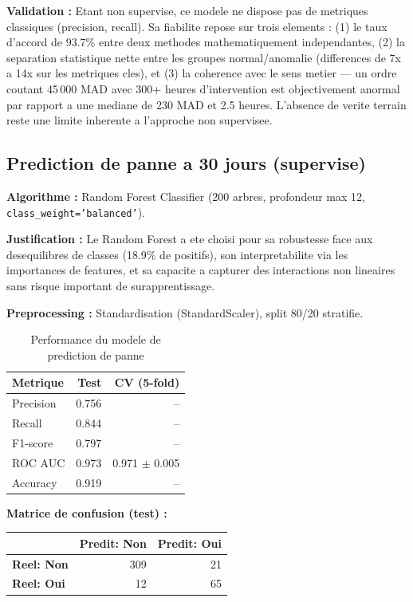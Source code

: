 \documentclass[12pt,a4paper]{article}
\begin{document}
\textbf{Validation :} Etant non supervise, ce modele ne dispose pas de metriques classiques (precision, recall). Sa fiabilite repose sur trois elements : (1) le taux d'accord de 93.7\% entre deux methodes mathematiquement independantes, (2) la separation statistique nette entre les groupes normal/anomalie (differences de 7x a 14x sur les metriques cles), et (3) la coherence avec le sens metier --- un ordre coutant 45\,000 MAD avec 300+ heures d'intervention est objectivement anormal par rapport a une mediane de 230 MAD et 2.5 heures. L'absence de verite terrain reste une limite inherente a l'approche non supervisee.

\subsection{Prediction de panne a 30 jours (supervise)}

\textbf{Algorithme :} Random Forest Classifier (200 arbres, profondeur max 12, \texttt{class\_weight='balanced'}).

\textbf{Justification :} Le Random Forest a ete choisi pour sa robustesse face aux desequilibres de classes (18.9\% de positifs), son interpretabilite via les importances de features, et sa capacite a capturer des interactions non lineaires sans risque important de surapprentissage.

\textbf{Preprocessing :} Standardisation (StandardScaler), split 80/20 stratifie.

\begin{table}[H]
\centering
\begin{tabular}{lrr}
\toprule
\textbf{Metrique} & \textbf{Test} & \textbf{CV (5-fold)} \\
\midrule
Precision & 0.756 & -- \\
Recall & 0.844 & -- \\
F1-score & 0.797 & -- \\
ROC AUC & 0.973 & 0.971 $\pm$ 0.005 \\
Accuracy & 0.919 & -- \\
\bottomrule
\end{tabular}
\caption{Performance du modele de prediction de panne}
\end{table}

\textbf{Matrice de confusion (test) :}
\begin{table}[H]
\centering
\begin{tabular}{l|rr}
 & \textbf{Predit: Non} & \textbf{Predit: Oui} \\
\midrule
\textbf{Reel: Non} & 309 & 21 \\
\textbf{Reel: Oui} & 12 & 65 \\
\end{tabular}
\end{table}
\end{document}
